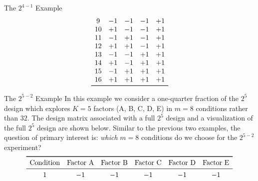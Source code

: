 \begin{itemize}
\begin{Example}{The $ 2^{4-1} $ Example}{}
\[\begin{array}{ccccc}
                              9                & -1              & -1              & -1              & +1              \\
                              10               & +1              & -1              & -1              & +1              \\
                              11               & -1              & +1              & -1              & +1              \\
                              12               & +1              & +1              & -1              & +1              \\
                              13               & -1              & -1              & +1              & +1              \\
                              14               & +1              & -1              & +1              & +1              \\
                              15               & -1              & +1              & +1              & +1              \\
                              16               & +1              & +1              & +1              & +1              \\
                              \bottomrule
                        \end{array} \]
            \end{Example}
            \begin{Example}{The $ 2^{5-2} $ Example}{}
                  In this example we consider a one-quarter fraction of the $2^5$ design which
                  explores $K = 5$ factors (A, B, C, D, E) in $m = 8$ conditions rather than $32$. The design matrix
                  associated with a full $2^5$ design and a visualization of the full $2^5$ design are shown below. Similar
                  to the previous two examples, the question of primary interest is: \emph{which} $m = 8$ conditions do we
                  choose for the $2^{5-2}$ experiment?
                  \[ \begin{array}{cccccc}
                              \toprule
                              \text{Condition} & \text{Factor A} & \text{Factor B} & \text{Factor C} & \text{Factor D} & \text{Factor E} \\
                              \midrule
                              1                & -1              & -1              & -1              & -1              & -1              \\

\end{array}\]
\end{Example}
\end{itemize}

